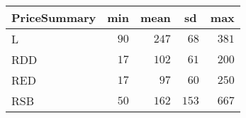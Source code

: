 %
\begin{table}[!tbp]
\begin{center}
\begin{tabular}{lrrrr}
\hline\hline
\multicolumn{1}{l}{PriceSummary}&\multicolumn{1}{c}{min}&\multicolumn{1}{c}{mean}&\multicolumn{1}{c}{sd}&\multicolumn{1}{c}{max}\tabularnewline
\hline
L&$90$&$247$&$ 68$&$381$\tabularnewline
RDD&$17$&$102$&$ 61$&$200$\tabularnewline
RED&$17$&$ 97$&$ 60$&$250$\tabularnewline
RSB&$50$&$162$&$153$&$667$\tabularnewline
\hline
\end{tabular}
\end{center}
\end{table}

